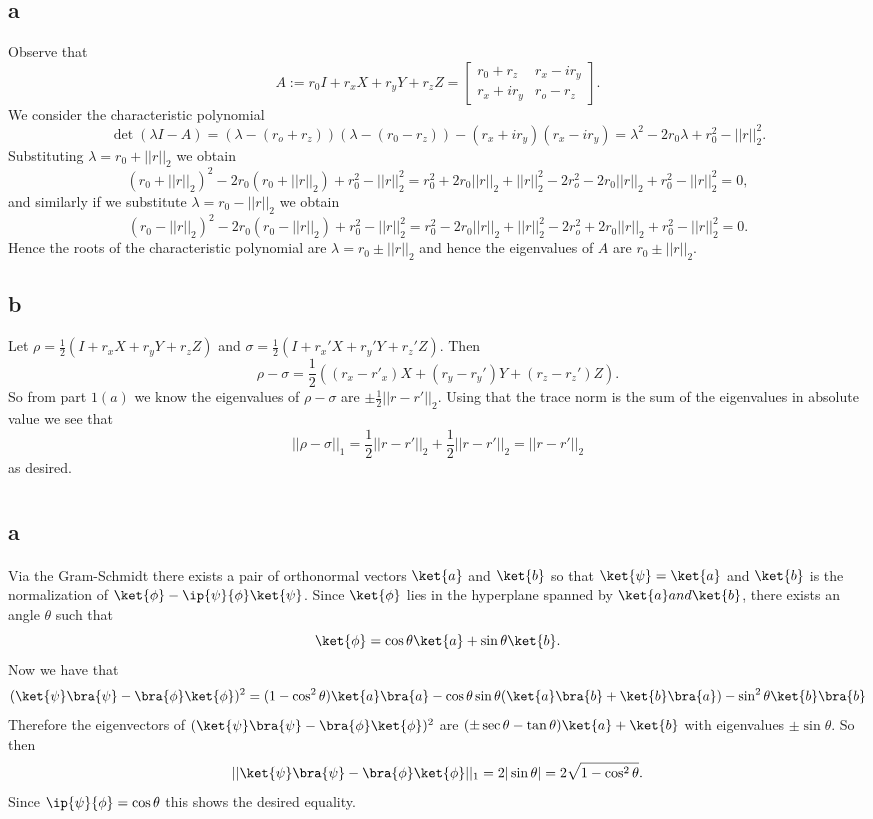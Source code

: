 \documentclass[letterpaper,12pt,oneside,onecolumn]{article}
\begin{document}
\section{}
\subsection{a}
Observe that 
$$A:= r_0I + r_xX + r_yY + r_zZ = \begin{bmatrix}
r_0 + r_z & r_x - ir_y \\ r_x + ir_y & r_o -r_z
\end{bmatrix}.$$
We consider the characteristic polynomial
$$\det(\lambda I - A) = (\lambda - (r_o+r_z))(\lambda - (r_0 -r_z)) -(r_x+ir_y)(r_x-ir_y) = \lambda^2 - 2r_0\lambda +r_0^2 - ||r||_2^2.$$
Substituting $\lambda = r_0 + ||r||_2$ we obtain
$$(r_0 + ||r||_2)^2 - 2r_0(r_0 + ||r||_2) + r_0^2 - ||r||_2^2 = r_0^2 + 2r_0||r||_2 + ||r||_2^2 - 2r_o^2 -2r_0||r||_2 +r_0^2 - ||r||_2^2 = 0,$$
and similarly if we substitute $\lambda=r_0 - ||r||_2$ we obtain
$$(r_0 - ||r||_2)^2 - 2r_0(r_0 -||r||_2) + r_0^2 - ||r||_2^2 = r_0^2 - 2r_0||r||_2 + ||r||_2^2 - 2r_o^2 +2r_0||r||_2 +r_0^2 - ||r||_2^2 = 0.$$
Hence the roots of the characteristic polynomial are $\lambda = r_0 \pm ||r||_2$ and hence the eigenvalues of $A$ are  $r_0 \pm ||r||_2$.
\subsection{b}
Let $\rho = \frac{1}{2}(I + r_xX + r_yY + r_zZ)$ and $\sigma =  \frac{1}{2}(I + r_x'X + r_y'Y + r_z'Z)$. Then
$$\rho-\sigma =\frac{1}{2}( (r_x-r'_x)X + (r_y-r_y')Y + (r_z-r_z')Z).$$
So from part $1(a)$ we know the eigenvalues of $\rho-\sigma$ are $\pm \frac{1}{2}||r - r'||_2.$
Using that the trace norm is the sum of the eigenvalues in absolute value we see that
$$||\rho-\sigma||_1 = \frac{1}{2}||r-r'||_2 + \frac{1}{2}||r-r'||_2 = ||r-r'||_2$$
as desired.
\newpage
\section{}
\subsection{a}
\paragraph{}
Via the Gram-Schmidt there exists a pair of orthonormal vectors $\ket{a}$ and $\ket{b}$ so that $\ket{\psi}=\ket{a}$ and $\ket{b}$ is the normalization of $\ket{\phi} - \ip{\psi}{\phi}\ket{\psi}$. Since $\ket{\phi}$ lies in the hyperplane spanned by $\ket{a} and \ket{b}$, there exists an angle $\theta$ such that 
$$\ket{\phi} = \cos \theta \ket{a} + \sin \theta\ket{b}.$$
Now we have that
$$(\ket{\psi}\bra{\psi} - \bra{\phi}\ket{\phi})^2 = (1-\cos^2\theta)\ket{a}\bra{a} - \cos\theta\sin\theta(\ket{a}\bra{b} + \ket{b}\bra{a}) -\sin^2\theta\ket{b}\bra{b}$$
Therefore the eigenvectors of $(\ket{\psi}\bra{\psi} - \bra{\phi}\ket{\phi})^2$ are $(\pm\sec\theta - \tan\theta)\ket{a} + \ket{b}$ with eigenvalues $\pm\sin\theta$. So then
$$||\ket{\psi}\bra{\psi} - \bra{\phi}\ket{\phi}||_1 = 2|\sin\theta| = 2\sqrt{1-\cos^2\theta}.$$
Since $\ip{\psi}{\phi} = \cos\theta$ this shows the desired equality.
\end{document}
